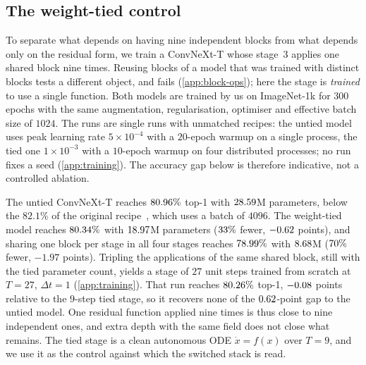 \subsection{The weight-tied control}
\label{sec:weight_tied}

To separate what depends on having nine independent blocks from what depends only on
the residual form, we train a ConvNeXt-T whose stage~3 applies one shared block nine
times.
Reusing blocks of a model that was trained with distinct blocks tests a different
object, and fails (\cref{app:block-ops}); here the stage is \emph{trained} to use a
single function.
Both models are trained by us on ImageNet-1k for $300$ epochs with the same
augmentation, regularisation, optimiser and effective batch size of $1024$.
The runs are single runs with unmatched recipes: the untied model uses peak learning
rate $5{\times}10^{-4}$ with a $20$-epoch warmup on a single process, the tied one
$1{\times}10^{-3}$ with a $10$-epoch warmup on four distributed processes; no run
fixes a seed (\cref{app:training}).
The accuracy gap below is therefore indicative, not a controlled ablation.

The untied ConvNeXt-T reaches $80.96\%$ top-1 with $28.59$M parameters,
below the $82.1\%$ of the original recipe~\citep{liu2022convnext}, which uses a batch
of $4096$.
The weight-tied model reaches $80.34\%$ with $18.97$M parameters
($33\%$ fewer, $-0.62$ points), and sharing one block per
stage in all four stages reaches $78.99\%$ with $8.68$M
($70\%$ fewer, $-1.97$ points).
Tripling the applications of the same shared block, still with the tied parameter
count, yields a stage of $27$ unit steps trained from scratch at $T{=}27$,
$\Delta t{=}1$ (\cref{app:training}).
That run reaches $80.26\%$ top-1, $-0.08$ points
relative to the $9$-step tied stage, so it recovers none of the $0.62$-point
gap to the untied model.
One residual function applied nine times is thus close to nine independent ones, and
extra depth with the same field does not close what remains.
The tied stage is a clean autonomous ODE $\dot x=f(x)$ over $T{=}9$, and we use it as
the control against which the switched stack is read.
